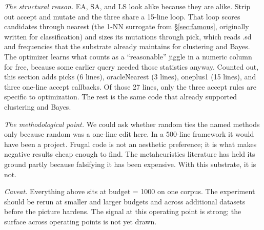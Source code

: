 \textit{The structural reason.} EA, SA, and LS look alike because
they are alike. Strip out \textsf{accept} and \textsf{mutate} and the
three share a 15-line loop. That loop scores candidates through
\textsf{nearest} (the 1-NN surrogate from \S\ref{sec:famous},
originally written for classification) and sizes its mutations
through \textsf{pick}, which reads .\textsf{sd} and
 frequencies that the substrate already maintains for
clustering and Bayes. The optimizer learns what counts as a
``reasonable'' jiggle in a numeric column for free, because some
earlier query needed those statistics anyway. Counted out, this
section adds \textsf{picks} (6 lines), \textsf{oracleNearest} (3
lines), \textsf{oneplus1} (15 lines), and three one-line
\textsf{accept} callbacks. Of those 27 lines, only the three accept
rules are specific to optimization. The rest is the same code that
already supported clustering and Bayes.

\textit{The methodological point.} We could ask whether random ties
the named methods only because random was a one-line edit here. In a
500-line framework it would have been a project. Frugal code is not
an aesthetic preference; it is what makes negative results cheap
enough to find. The metaheuristics literature has held its ground
partly because falsifying it has been expensive. With this substrate,
it is not.

\textit{Caveat.} Everything above sits at budget = 1000 on one
corpus. The experiment should be rerun at smaller and larger budgets
and across additional datasets before the picture hardens. The signal
at this operating point is strong; the surface across operating
points is not yet drawn.